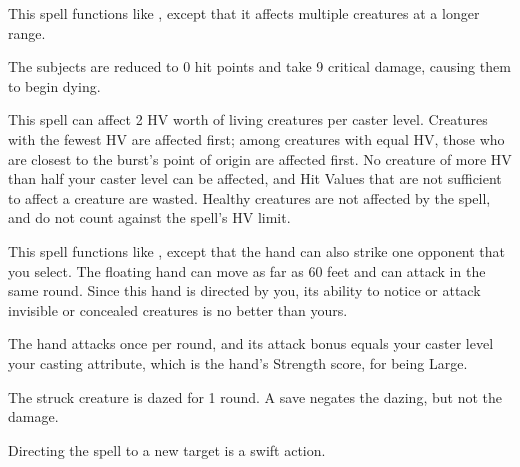 \begin{spelleffect}
  This spell functions like , except that it affects multiple creatures at a longer range.
\end{spelleffect}

\spellrng{\rngmed}
\begin{spellblood}
  The subjects are reduced to 0 hit points and take 9 critical damage, causing them to begin dying.
\end{spellblood}
\begin{spellnotes}
  This spell can affect 2 HV worth of living creatures per caster level. Creatures with the fewest HV are affected first; among creatures with equal HV, those who are closest to the burst's point of origin are affected first. No creature of more HV than half your caster level can be affected, and Hit Values that are not sufficient to affect a creature are wasted. Healthy creatures are not affected by the spell, and do not count against the spell's HV limit.
\end{spellnotes}

\begin{spelleffect}
  This spell functions like , except that the hand can also strike one opponent that you select. The floating hand can move as far as 60 feet and can attack in the same round. Since this hand is directed by you, its ability to notice or attack invisible or concealed creatures is no better than yours.
  \par The hand attacks once per round, and its attack bonus equals your caster level \add your casting attribute, which is the hand's Strength score,  for being Large.
\end{spelleffect}
\begin{spellblood}
  The struck creature is dazed for 1 round. A save negates the dazing, but not the damage.
\end{spellblood}
\begin{spellnotes}
  Directing the spell to a new target is a swift action.
\end{spellnotes}

